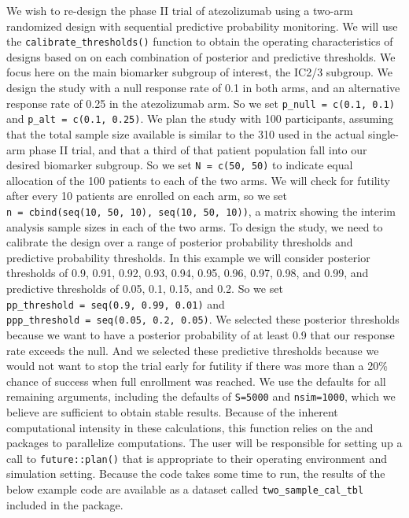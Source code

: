 We wish to re-design the phase II trial of atezolizumab using a two-arm
randomized design with sequential predictive probability monitoring. We
will use the \texttt{calibrate\_thresholds()} function to obtain the
operating characteristics of designs based on on each combination of
posterior and predictive thresholds. We focus here on the main biomarker
subgroup of interest, the IC2/3 subgroup. We design the study with a
null response rate of 0.1 in both arms, and an alternative response rate
of 0.25 in the atezolizumab arm. So we set
\texttt{p\_null\ =\ c(0.1,\ 0.1)} and \texttt{p\_alt\ =\ c(0.1,\ 0.25)}.
We plan the study with 100 participants, assuming that the total sample
size available is similar to the 310 used in the actual single-arm phase
II trial, and that a third of that patient population fall into our
desired biomarker subgroup. So we set \texttt{N\ =\ c(50,\ 50)} to
indicate equal allocation of the 100 patients to each of the two arms.
We will check for futility after every 10 patients are enrolled on each
arm, so we set
\texttt{n\ =\ cbind(seq(10,\ 50,\ 10),\ seq(10,\ 50,\ 10))}, a matrix
showing the interim analysis sample sizes in each of the two arms. To
design the study, we need to calibrate the design over a range of
posterior probability thresholds and predictive probability thresholds.
In this example we will consider posterior thresholds of 0.9, 0.91,
0.92, 0.93, 0.94, 0.95, 0.96, 0.97, 0.98, and 0.99, and predictive
thresholds of 0.05, 0.1, 0.15, and 0.2. So we set
\texttt{pp\_threshold\ =\ seq(0.9,\ 0.99,\ 0.01)} and
\texttt{ppp\_threshold\ =\ seq(0.05,\ 0.2,\ 0.05)}. We selected these
posterior thresholds because we want to have a posterior probability of
at least 0.9 that our response rate exceeds the null. And we selected
these predictive thresholds because we would not want to stop the trial
early for futility if there was more than a 20\% chance of success when
full enrollment was reached. We use the defaults for all remaining
arguments, including the defaults of \texttt{S=5000} and
\texttt{nsim=1000}, which we believe are sufficient to obtain stable
results. Because of the inherent computational intensity in these
calculations, this function relies on the 
\citep{Bengtsson2021} and  \citep{Vaughan2021} packages
to parallelize computations. The user will be responsible for setting up
a call to \texttt{future::plan()} that is appropriate to their operating
environment and simulation setting. Because the code takes some time to
run, the results of the below example code are available as a dataset
called \texttt{two\_sample\_cal\_tbl} included in the 
package.

